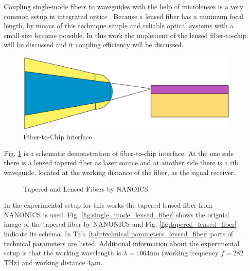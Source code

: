 Coupling single-mode fibers to waveguides with the help of microlenses is a very common setup in integrated optics \cite{integrated_optics}. Because a lensed fiber has a minimum focal length, by means of this technique simple and reliable optical systems with a small size become possible. In this work the implement of the lensed fiber-to-chip will be discussed and it coupling efficiency will be discussed.\\

\begin{figure}[!ht]
\centering
\includegraphics[width=.7\textwidth]{bilder/experiment_object}
\caption{Fiber-to-Chip interface}
\label{fig:experiment_object}
\end{figure}
Fig. \ref{fig:experiment_object} is a schematic demonstration of fiber-to-chip interface. At the one side there is a lensed tapered fiber as laser source and at another side there is a rib waveguide\cite{integrated_optics}, located at the working distance of the fiber, as the signal receiver.\\
 
\begin{figure}[!ht]
\centering
{}
\hfill
{}
\label{fig:TLFs}
\caption{ Tapered and Lensed Fibers by NANOICS }
\end{figure}
In the experimental setup for this works the tapered lensed fiber from NANONICS\cite{nanoscal_tapered_fiber} is used. Fig. \ref{fig:single_mode_lensed_fiber} shows the orignial image of the tapered fiber by NANONICS and Fig. \ref{fig:tapered_lensed_fiber} indicate its schema. In Tab. \ref{tab:technical parameters_lensed_fiber} parts of technical parameters are listed. Additional information about the experimental setup is that the working wavelength is $\lambda=1064$nm (working frequency $f=282$THz) and working distance $4\mu$m.\\
 
